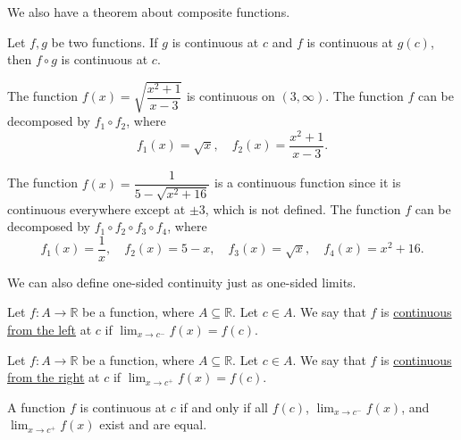 \documentclass[11pt]{book}
\theoremstyle{break}
\theoremstyle{no_label}
\newcommand{\bbR}{\mathbb{R}}
\numberwithin{equation}{section}
\begin{document}
We also have a theorem about composite functions.

\begin{theorem}
    Let $f, g$ be two functions. If $g$ is continuous at $c$ and $f$ is continuous at $g(c)$, then $f\circ g$ is continuous at $c$.
\end{theorem}

\begin{example} 
    The function $f(x)=\sqrt{\dfrac{x^2+1}{x-3}}$ is continuous on $(3, \infty)$. The function $f$ can be decomposed by $f_1\circ f_2$, where \begin{equation*}
        f_1(x)=\sqrt{x},\quad f_2(x)=\dfrac{x^2+1}{x-3}.
    \end{equation*}
\end{example}

\begin{example} 
    The function $f(x)=\dfrac{1}{5-\sqrt{x^2+16}}$ is a continuous function since it is continuous everywhere except at $\pm3$, which is not defined. The function $f$ can be decomposed by $f_1\circ f_2\circ f_3\circ f_4$, where \begin{equation*}
        f_1(x)=\dfrac{1}{x}, \quad f_2(x)=5-x, \quad f_3(x)=\sqrt{x}, \quad f_4(x)=x^2+16.
    \end{equation*}
\end{example}

We can also define one-sided continuity just as one-sided limits.

\begin{definition}
    Let $f:A\to\bbR$ be a function, where $A\subseteq\bbR$. Let $c\in A$. We say that $f$ is \underline{continuous from the left} at $c$ if $\displaystyle\lim_{x\to c^-}f(x)=f(c)$.
\end{definition}

\begin{definition}
    Let $f:A\to\bbR$ be a function, where $A\subseteq\bbR$. Let $c\in A$. We say that $f$ is \underline{continuous from the right} at $c$ if $\displaystyle\lim_{x\to c^+}f(x)=f(c)$.
\end{definition}

\begin{theorem}
    A function $f$ is continuous at $c$ if and only if all $f(c)$, $\displaystyle\lim_{x\to c^-}f(x)$, and $\displaystyle\lim_{x\to c^+}f(x)$ exist and are equal.
\end{theorem}
\end{document}
